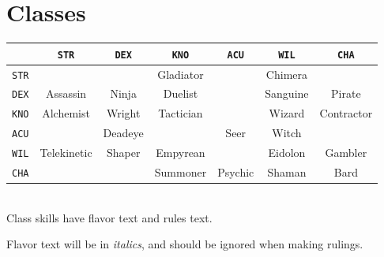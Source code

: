 \documentclass[12pt]{article}
\newcommand{\STR}{\texttt{STR}}
\newcommand{\DEX}{\texttt{DEX}}
\newcommand{\KNO}{\texttt{KNO}}
\newcommand{\ACU}{\texttt{ACU}}
\newcommand{\WIL}{\texttt{WIL}}
\newcommand{\CHA}{\texttt{CHA}}
\begin{document}
\pagebreak
\section{Classes}

\begin{tabularx}{\textwidth}{c|CCCCCC}
& \STR & \DEX & \KNO & \ACU & \WIL & \CHA \\\hline
\STR &  &  & Gladiator &  & Chimera &  \\
\DEX & Assassin & Ninja & Duelist & & Sanguine & Pirate \\
\KNO & Alchemist & Wright & Tactician & & Wizard & Contractor \\
\ACU & & Deadeye & & Seer & Witch &  \\
\WIL & Telekinetic & Shaper & Empyrean & & Eidolon & Gambler \\
\CHA & & & Summoner & Psychic & Shaman & Bard \\
\end{tabularx}
\\[5mm]
Class skills have flavor text and rules text.

Flavor text will be in \textit{italics}, and should be ignored when making rulings.
\end{document}
